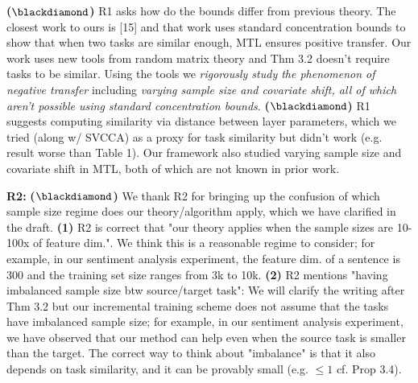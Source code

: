 \documentclass{article}
\begin{document}
\vspace{-0.045in}
\textbf{($\blackdiamond$)} R1 asks how do the bounds differ from previous theory. The closest work to ours is [15] and that work uses standard concentration bounds to show that when two tasks are similar enough, MTL ensures positive transfer.
Our work uses new tools from random matrix theory and Thm 3.2 doesn't require tasks to be similar.
Using the tools we \textit{rigorously study the phenomenon of negative transfer} including \textit{varying sample size and covariate shift, all of which aren't possible using standard concentration bounds}.
\textbf{($\blackdiamond$)} R1 suggests computing similarity via distance between layer parameters,
which we tried (along w/ SVCCA) as a proxy for task similarity but didn't work  (e.g. result worse than Table 1).
Our framework also studied varying sample size and covariate shift in MTL, both of which are not known in prior work.
%

\vspace{-0.025in}
\textbf{R2:}
\textbf{($\blackdiamond$)} We thank R2 for bringing up the confusion of which sample size regime does our theory/algorithm apply, which we have clarified in the draft.
\textbf{(1)} R2 is correct that "our theory applies when the sample sizes are 10-100x of feature dim.".
We think this is a reasonable regime to consider; for example, in our sentiment analysis experiment, the feature dim. of a sentence is 300 and the training set size ranges from 3k to 10k.
\textbf{(2)} R2 mentions "having imbalanced sample size btw source/target task": We will clarify the writing after Thm 3.2 but our incremental training scheme does not assume that the tasks have imbalanced sample size; for example, in our sentiment analysis experiment, we have observed that our method can help even when the source task is smaller than the target.
The correct way to think about "imbalance" is that it also depends on task similarity, and it can be provably small (e.g. $\le 1$ cf. Prop 3.4).
\end{document}
